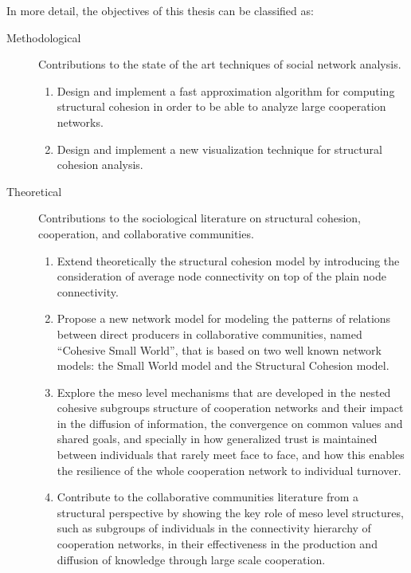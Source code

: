 In more detail, the objectives of this thesis can be classified as:

\begin{description}

\item[Methodological] Contributions to the state of the art techniques of social network analysis.

\begin{enumerate}

\item Design and implement a fast approximation algorithm for computing structural cohesion in order to be able to analyze large cooperation networks.

\item Design and implement a new visualization technique for structural cohesion analysis.

\end{enumerate}

\item[Theoretical] Contributions to the sociological literature on structural cohesion, cooperation, and collaborative communities.

\begin{enumerate}

\item Extend theoretically the structural cohesion model by introducing the consideration of average node connectivity on top of the plain node connectivity. 

\item Propose a new network model for modeling the patterns of relations between direct producers in collaborative communities, named ``Cohesive Small World'', that is based on two well known network models: the Small World model and the Structural Cohesion model. 

\item Explore the meso level mechanisms that are developed in the nested cohesive subgroups structure of cooperation networks and their impact in the diffusion of information, the convergence on common values and shared goals, and specially in how generalized trust is maintained between individuals that rarely meet face to face, and how this enables the resilience of the whole cooperation network to individual turnover.

\item Contribute to the collaborative communities literature from a structural perspective by showing the key role of meso level structures, such as subgroups of individuals in the connectivity hierarchy of cooperation networks, in their effectiveness in the production and diffusion of knowledge through large scale cooperation. 


\end{enumerate}
\end{description}
